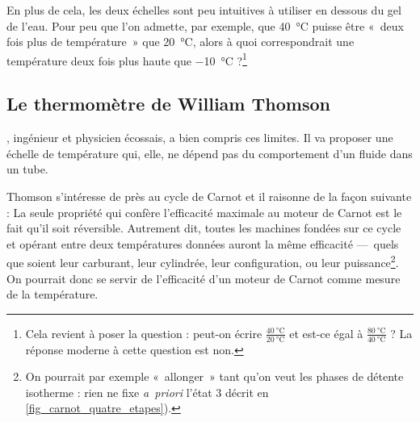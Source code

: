 		En plus de cela, les deux échelles sont peu intuitives à utiliser en dessous du gel de l’eau. Pour peu que l’on admette, par exemple, que \SI{40}{\celsius} puisse être «~deux fois plus de température~» que \SI{20}{\celsius}, alors à quoi correspondrait une température deux fois plus haute que \SI{-10}{\celsius} ?\footnote{Cela revient à poser la question : peut-on écrire $\frac{\SI{40}{\celsius}}{\SI{20}{\celsius}}$ et est-ce égal à $\frac{\SI{80}{\celsius}}{\SI{40}{\celsius}}$ ? La réponse moderne à cette question est non.}
	
	\subsection{Le thermomètre de William Thomson}
	
		, ingénieur et physicien écossais, a bien compris ces limites. Il va proposer une échelle de température qui, elle, ne dépend pas du comportement d’un fluide dans un tube.

		Thomson s’intéresse de près au cycle de Carnot et il raisonne de la façon suivante : La seule propriété qui confère l’efficacité maximale au moteur de Carnot est le fait qu’il soit réversible. Autrement dit, toutes les machines fondées sur ce cycle et opérant entre deux températures données auront la même efficacité —\ quels que soient leur carburant, leur cylindrée, leur configuration, ou leur puissance\footnote{On pourrait par exemple «~allonger~» tant qu’on veut les phases de détente isotherme : rien ne fixe \textit{a~priori} l’état 3 décrit en \cref{fig_carnot_quatre_etapes}).}. On pourrait donc se servir de l’efficacité d’un moteur de Carnot comme mesure de la température.
		
